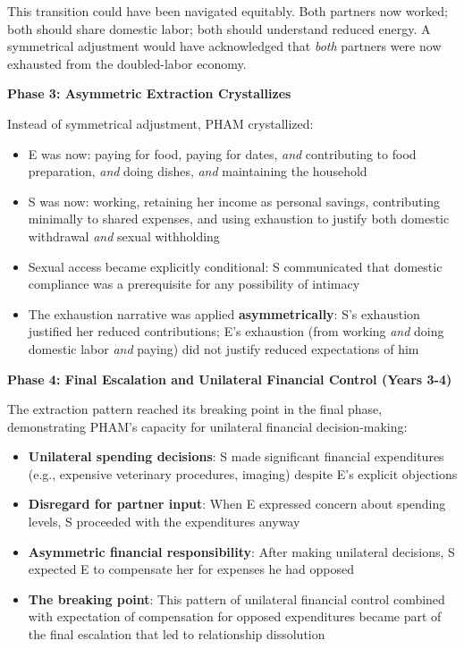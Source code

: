 \documentclass[12pt, letterpaper]{article}
\begin{document}
This transition could have been navigated equitably. Both partners now worked; both should share domestic labor; both should understand reduced energy. A symmetrical adjustment would have acknowledged that \textit{both} partners were now exhausted from the doubled-labor economy.

\textbf{Phase 3: Asymmetric Extraction Crystallizes}

Instead of symmetrical adjustment, PHAM crystallized:
\begin{itemize}
    \item E was now: paying for food, paying for dates, \textit{and} contributing to food preparation, \textit{and} doing dishes, \textit{and} maintaining the household
    \item S was now: working, retaining her income as personal savings, contributing minimally to shared expenses, and using exhaustion to justify both domestic withdrawal \textit{and} sexual withholding
    \item Sexual access became explicitly conditional: S communicated that domestic compliance was a prerequisite for any possibility of intimacy
    \item The exhaustion narrative was applied \textbf{asymmetrically}: S's exhaustion justified her reduced contributions; E's exhaustion (from working \textit{and} doing domestic labor \textit{and} paying) did not justify reduced expectations of him
\end{itemize}

\textbf{Phase 4: Final Escalation and Unilateral Financial Control (Years 3-4)}

The extraction pattern reached its breaking point in the final phase, demonstrating PHAM's capacity for unilateral financial decision-making:

\begin{itemize}
    \item \textbf{Unilateral spending decisions}: S made significant financial expenditures (e.g., expensive veterinary procedures, imaging) despite E's explicit objections
    \item \textbf{Disregard for partner input}: When E expressed concern about spending levels, S proceeded with the expenditures anyway
    \item \textbf{Asymmetric financial responsibility}: After making unilateral decisions, S expected E to compensate her for expenses he had opposed
    \item \textbf{The breaking point}: This pattern of unilateral financial control combined with expectation of compensation for opposed expenditures became part of the final escalation that led to relationship dissolution
\end{itemize}
\end{document}
